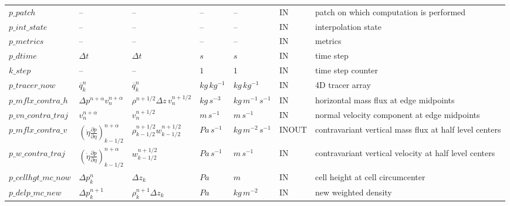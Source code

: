 \begin{landscape}
\begin{singlespacing}
\begin{longtable}{p{2.9cm}|x{2.3cm}|x{2.3cm}|x{1.9cm}|x{1.9cm}|x{2.2cm}|p{8.2cm}}
$p\_patch$              &   --                            &   --                          &  --             &  --                   &  IN       &  patch on which computation is performed\\
$p\_int\_state$         &   --                            &   --                          &  --             &  --                   &  IN       &  interpolation state\\
$p\_metrics$            &   --                            &   --                          &  --             &  --                   &  IN       &  metrics\\
$p\_dtime$              &  $\Delta t$                     &  $\Delta t$                   &  $s$            &  $s$                  &  IN       &  time step\\
$k\_step$               &  --                             &  --                           &  $1$            &  $1$                  &  IN       &  time step counter\\
$p\_tracer\_now$        &  $\overline{q}^{n}_{k}$         &  $\overline{q}^{n}_{k}$       &  $kg\,kg^{-1}$  &  $kg\,kg^{-1}$        &  IN       &  4D tracer array\\
$p\_mflx\_contra\_h$    &  $\Delta p^{n+\alpha} v_{n}^{n+\alpha}$&  $\rho^{n+1/2}\Delta z\, v_{n}^{n+1/2}$ & $kg\,s^{-3}$&  $kg\,m^{-1}\,s^{-1}$&  IN&  horizontal mass flux at edge midpoints\\
$p\_vn\_contra\_traj$   &  $v_{n}^{n+\alpha}$             &  $v_{n}^{n+1/2}$              &  $m\,s^{-1}$    &  $m\,s^{-1}$          &  IN       &  normal velocity component at edge midpoints\\
$p\_mflx\_contra\_v$    &  $(\dot{\eta}\frac{\partial p}{\partial \eta})^{n+\alpha}_{k-1/2}$&  $\rho^{n+1/2}_{k-1/2}w^{n+1/2}_{k-1/2}$&  $Pa\,s^{-1}$&   $kg\,m^{-2}\,s^{-1}$&  INOUT &  contravariant vertical mass flux at half level centers\\
$p\_w\_contra\_traj$    &  $(\dot{\eta}\frac{\partial p}{\partial \eta})^{n+\alpha}_{k-1/2}$&  $w^{n+1/2}_{k-1/2}$&   $Pa\,s^{-1}$  &  $m\,s^{-1}$&  IN&  contravariant vertical velocity at half level centers\\
$p\_cellhgt\_mc\_now$   &  $\Delta p^{n}_{k}$             &  $\Delta z_{k}$               &  $Pa$           &  $m$                  &  IN       &  cell height at cell circumcenter\\
$p\_delp\_mc\_new$      &  $\Delta p^{n+1}_{k}$           &  $\rho^{n+1}_{k}\Delta z_{k}$ &  $Pa$           &  $kg\,m^{-2}$         &  IN       &  new weighted density \\

\end{longtable}
\end{singlespacing}
\end{landscape}
